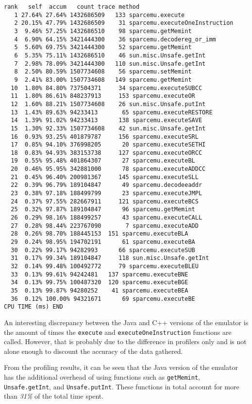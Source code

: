 \begin{verbatim}
rank   self  accum   count trace method
   1 27.64% 27.64% 1432686509	133 sparcemu.execute
   2 20.15% 47.79% 1432686509	 31 sparcemu.executeOneInstruction
   3  9.46% 57.25% 1432686510	 98 sparcemu.getMemint
   4  6.90% 64.15% 3421444300	 36 sparcemu.decodereg_or_imm
   5  5.60% 69.75% 3421444300	 52 sparcemu.getMemint
   6  5.35% 75.11% 1432686510	 46 sun.misc.Unsafe.getInt
   7  2.98% 78.09% 3421444300	110 sun.misc.Unsafe.getInt
   8  2.50% 80.59% 1507734608	 56 sparcemu.setMemint
   9  2.41% 83.00% 1507734608	149 sparcemu.getMemint
  10  1.80% 84.80% 737504371 	 34 sparcemu.executeSUBCC
  11  1.80% 86.61% 848237913	 153 sparcemu.executeOR
  12  1.60% 88.21% 1507734608	 26 sun.misc.Unsafe.putInt
  13  1.43% 89.63% 94233413 	  65 sparcemu.executeRESTORE
  14  1.39% 91.02% 94233413 	 138 sparcemu.executeSAVE
  15  1.30% 92.33% 1507734608	 42 sun.misc.Unsafe.getInt
  16  0.93% 93.25% 401879787	 156 sparcemu.executeSRL
  17  0.85% 94.10% 376998205	  20 sparcemu.executeSETHI
  18  0.83% 94.93% 383153738	 127 sparcemu.executeORCC
  19  0.55% 95.48% 401864307	  27 sparcemu.executeBL
  20  0.46% 95.95% 342881000	  78 sparcemu.executeADDCC
  21  0.45% 96.40% 200981367	 145 sparcemu.executeSLL
  22  0.39% 96.79% 189104847	  49 sparcemu.decodeeaddr
  23  0.38% 97.18% 188499799	  23 sparcemu.executeJMPL
  24  0.37% 97.55% 282667911	 121 sparcemu.executeBCS
  25  0.32% 97.87% 189104847	  96 sparcemu.getMemint
  26  0.29% 98.16% 188499257	  43 sparcemu.executeCALL
  27  0.28% 98.44% 223767090	   7 sparcemu.executeADD
  28  0.26% 98.70% 188445153  151 sparcemu.executeBLA
  29  0.24% 98.95% 194702191	  61 sparcemu.executeBA
  30  0.22% 99.17% 94282993  	 66 sparcemu.executeSUB
  31  0.17% 99.34% 189104847	 118 sun.misc.Unsafe.getInt
  32  0.14% 99.48% 100492772 	 79 sparcemu.executeBLEU
  33  0.13% 99.61% 94242481   137 sparcemu.executeBNE
  34  0.13% 99.75% 100487320  120 sparcemu.executeBGE
  35  0.13% 99.87% 94280252    41 sparcemu.executeBEA
  36  0.12% 100.00% 94321671	  69 sparcemu.executeBE
CPU TIME (ms) END
\end{verbatim}

An interesting discrepancy between the Java and C++ versions of the
emulator is the amount of times the \verb!execute! and
\verb!executeOneInstruction! functions are called. However, that is
probably due to the difference in profilers only and is not alone enough
to discount the accuracy of the data gathered.

From the profiling results, it can be seen that the Java version of the
emulator has the additional overhead of using functions such as
\verb!getMemint!, \verb!Unsafe.getInt!, and \verb!Unsafe.putInt!. These
functions in total account for more than \emph{31\%} of the total time
spent.


